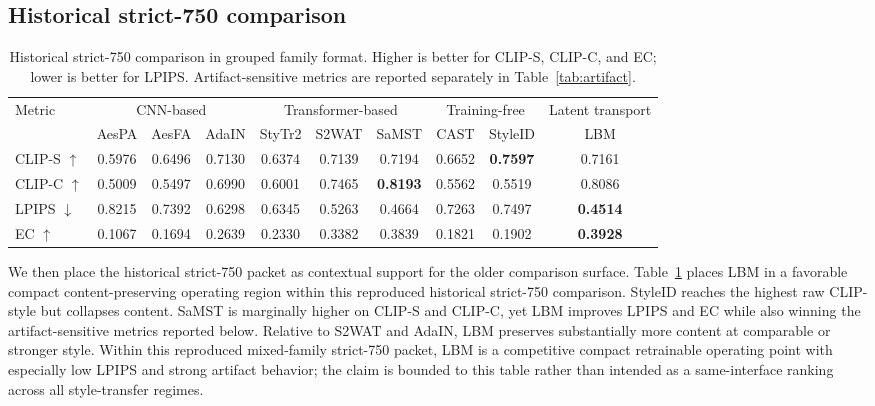 \documentclass[letterpaper]{article}
\begin{document}
\subsection{Historical strict-750 comparison}
\begin{table}[t]
\centering
\caption{Historical strict-750 comparison in grouped family format. Higher is better for CLIP-S, CLIP-C, and EC; lower is better for LPIPS. Artifact-sensitive metrics are reported separately in Table~\ref{tab:artifact}.}
\label{tab:main}
\small
\setlength{\tabcolsep}{4pt}
\begin{tabular}{lccccccccc}
\toprule
\multirow{2}{*}{Metric} & \multicolumn{3}{c}{CNN-based} & \multicolumn{3}{c}{Transformer-based} & \multicolumn{2}{c}{Training-free} & \multicolumn{1}{c}{Latent transport} \\
\cmidrule(lr){2-4} \cmidrule(lr){5-7} \cmidrule(lr){8-9} \cmidrule(l){10-10}
& AesPA & AesFA & AdaIN & StyTr2 & S2WAT & SaMST & CAST & StyleID & LBM \\
\midrule
CLIP-S $\uparrow$ & 0.5976 & 0.6496 & 0.7130 & 0.6374 & 0.7139 & 0.7194 & 0.6652 & \textbf{0.7597} & 0.7161 \\
CLIP-C $\uparrow$ & 0.5009 & 0.5497 & 0.6990 & 0.6001 & 0.7465 & \textbf{0.8193} & 0.5562 & 0.5519 & 0.8086 \\
LPIPS $\downarrow$ & 0.8215 & 0.7392 & 0.6298 & 0.6345 & 0.5263 & 0.4664 & 0.7263 & 0.7497 & \textbf{0.4514} \\
EC $\uparrow$ & 0.1067 & 0.1694 & 0.2639 & 0.2330 & 0.3382 & 0.3839 & 0.1821 & 0.1902 & \textbf{0.3928} \\
\bottomrule
\end{tabular}
\end{table}

We then place the historical strict-750 packet as contextual support for the older comparison surface. Table~\ref{tab:main} places LBM in a favorable compact content-preserving operating region within this reproduced historical strict-750 comparison. StyleID reaches the highest raw CLIP-style but collapses content. SaMST is marginally higher on CLIP-S and CLIP-C, yet LBM improves LPIPS and EC while also winning the artifact-sensitive metrics reported below. Relative to S2WAT and AdaIN, LBM preserves substantially more content at comparable or stronger style. Within this reproduced mixed-family strict-750 packet, LBM is a competitive compact retrainable operating point with especially low LPIPS and strong artifact behavior; the claim is bounded to this table rather than intended as a same-interface ranking across all style-transfer regimes.
\end{document}
